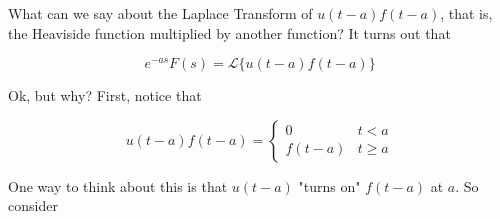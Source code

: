 \documentclass{article}
\theoremstyle{definition}
\begin{document}
\bigskip
\noindent
What can we say about the Laplace Transform of $u(t-a)f(t-a)$,
that is, the Heaviside function multiplied by another function?
It turns out that

\bigskip
\begin{equation*}
e^{-as} F(s) = \mathcal{L}\{u(t-a) f(t-a)\}
\label{eqn:lt_uf}
\end{equation*}


\bigskip
\noindent
Ok, but why? First, notice that

\bigskip
\begin{equation*}
u(t-a)f(t-a) =  
           \begin{cases} 
               0        & t < a  \\
               f(t-a)  & t \geq a
           \end{cases}
\end{equation*}

\bigskip
\noindent
One way to think about this is that $u(t-a)$ "turns on" $f(t-a)$
at $a$. So consider 
\end{document}
